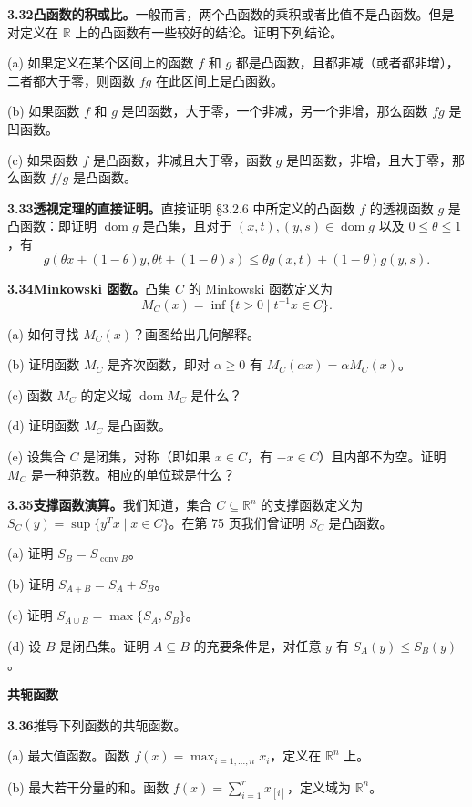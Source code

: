 \documentclass[UTF8,12pt,a4paper,fontset=fandol]{ctexart}
\DeclareMathOperator{\dom}{dom}
\begin{document}
\noindent\textbf{3.32\quad 凸函数的积或比。}\quad 一般而言，两个凸函数的乘积或者比值不是凸函数。但是对定义在 $\mathbb{R}$ 上的凸函数有一些较好的结论。证明下列结论。

(a) 如果定义在某个区间上的函数 $f$ 和 $g$ 都是凸函数，且都非减（或者都非增），二者都大于零，则函数 $fg$ 在此区间上是凸函数。

(b) 如果函数 $f$ 和 $g$ 是凹函数，大于零，一个非减，另一个非增，那么函数 $fg$ 是凹函数。

(c) 如果函数 $f$ 是凸函数，非减且大于零，函数 $g$ 是凹函数，非增，且大于零，那么函数 $f/g$ 是凸函数。

\noindent\textbf{3.33\quad 透视定理的直接证明。}\quad 直接证明 \S3.2.6 中所定义的凸函数 $f$ 的透视函数 $g$ 是凸函数：即证明 $\dom g$ 是凸集，且对于 $(x,t),(y,s)\in\dom g$ 以及 $0\leq\theta\leq1$，有
\[
g(\theta x+(1-\theta)y,\theta t+(1-\theta)s)\leq \theta g(x,t)+(1-\theta)g(y,s).
\]

\noindent\textbf{3.34\quad Minkowski 函数。}\quad 凸集 $C$ 的 Minkowski 函数定义为
\[
M_C(x)=\inf\{t>0\mid t^{-1}x\in C\}.
\]

(a) 如何寻找 $M_C(x)$？画图给出几何解释。

(b) 证明函数 $M_C$ 是齐次函数，即对 $\alpha\geq0$ 有 $M_C(\alpha x)=\alpha M_C(x)$。

(c) 函数 $M_C$ 的定义域 $\dom M_C$ 是什么？

(d) 证明函数 $M_C$ 是凸函数。

(e) 设集合 $C$ 是闭集，对称（即如果 $x\in C$，有 $-x\in C$）且内部不为空。证明 $M_C$ 是一种范数。相应的单位球是什么？

\noindent\textbf{3.35\quad 支撑函数演算。}\quad 我们知道，集合 $C\subseteq\mathbb{R}^n$ 的支撑函数定义为 $S_C(y)=\sup\{y^Tx\mid x\in C\}$。在第 75 页我们曾证明 $S_C$ 是凸函数。

(a) 证明 $S_B=S_{\operatorname{conv}B}$。

(b) 证明 $S_{A+B}=S_A+S_B$。

(c) 证明 $S_{A\cup B}=\max\{S_A,S_B\}$。

(d) 设 $B$ 是闭凸集。证明 $A\subseteq B$ 的充要条件是，对任意 $y$ 有 $S_A(y)\leq S_B(y)$。

\noindent\textbf{共轭函数}

\noindent\textbf{3.36}\quad 推导下列函数的共轭函数。

(a) 最大值函数。函数 $f(x)=\max_{i=1,\ldots,n}x_i$，定义在 $\mathbb{R}^n$ 上。

(b) 最大若干分量的和。函数 $f(x)=\sum_{i=1}^r x_{[i]}$，定义域为 $\mathbb{R}^n$。
\end{document}
